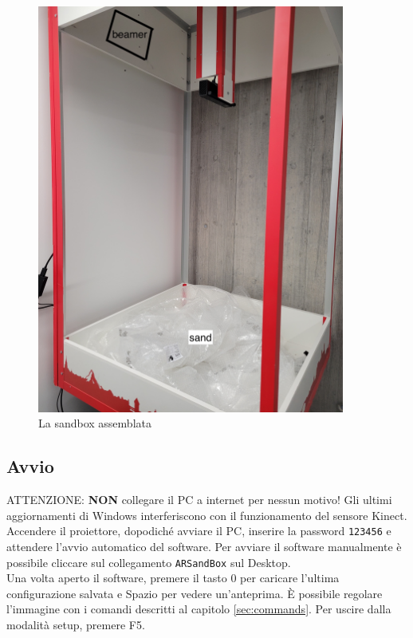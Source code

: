 \documentclass[12pt]{article}
\begin{document}
		\begin{figure}[H]
			\centering
			\includegraphics[width=0.9\textwidth]{img/sandbox.jpg}
			\caption*{La sandbox assemblata}
		\end{figure}
		
		
	\subsection{Avvio}

		ATTENZIONE: \textbf{NON} collegare il PC a internet per nessun motivo! Gli ultimi aggiornamenti
		di Windows interferiscono con il funzionamento del sensore Kinect.\\

		Accendere il proiettore, dopodiché avviare il PC, inserire la password \texttt{123456}
		e attendere l'avvio automatico del software.
		Per avviare il software manualmente è possibile cliccare sul collegamento
		\texttt{ARSandBox} sul Desktop.\\

		Una volta aperto il software, premere il tasto 0 per caricare l'ultima configurazione salvata e
		Spazio per vedere un'anteprima. È possibile regolare l'immagine con i comandi descritti
		al capitolo \ref{sec:commands}. Per uscire dalla modalità setup, premere F5.\\
\end{document}
